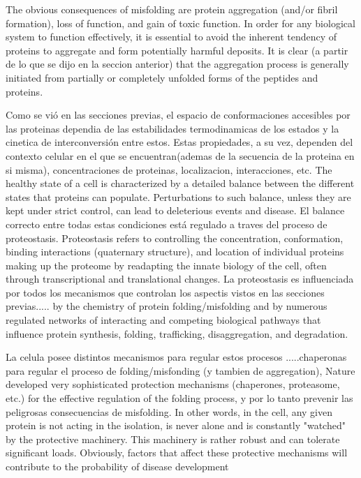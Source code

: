 The  obvious  consequences  of  misfolding  are protein  aggregation  (and/or  fibril  formation),  loss  of  function,  and  gain  of  toxic  function.  
In  order  for  any  biological  system  to  function  effectively,  it  is essential to avoid the inherent tendency of proteins to aggregate and form potentially harmful deposits.
It  is  clear (a partir de lo que se dijo en la seccion anterior)  that  the aggregation  process  is  generally   initiated  from  partially  or completely  unfolded  forms  of  the  peptides  and  proteins. 


Como se vió en las secciones previas, el espacio de conformaciones accesibles por las proteinas dependia de las estabilidades termodinamicas de los estados y la cinetica de interconversión entre estos. 
Estas propiedades, a su vez, dependen del contexto celular en el que se encuentran(ademas de la secuencia de la proteina en si misma), concentraciones de proteinas, localizacion, interacciones, etc.
The healthy state of a cell is characterized by a detailed balance between the different states that proteins can populate. 
Perturbations to such balance, unless they are kept under strict control, can lead to deleterious events and disease.
El balance correcto entre todas estas condiciones está regulado a traves del proceso de proteostasis.
Proteostasis refers to controlling the concentration, conformation, binding interactions (quaternary structure), and location of individual proteins making up the proteome by readapting the innate biology of the cell, 
often through transcriptional and translational changes.
La proteostasis es influenciada por todos los mecanismos que controlan los aspectis vistos en las secciones previas..... 
by the chemistry of protein folding/misfolding and by numerous regulated networks of interacting and competing biological pathways 
that influence protein synthesis, folding, trafficking, disaggregation, and degradation.

La celula posee distintos mecanismos para regular estos procesos .....chaperonas para regular el proceso de folding/misfonding (y tambien de aggregation), 
Nature developed very sophisticated protection mechanisms (chaperones, proteasome, etc.) for the effective regulation of the folding process, y por lo tanto prevenir las peligrosas consecuencias de misfolding. 
In other words, in the cell, any given protein is not acting in the isolation, is never alone and is constantly "watched" by the protective machinery. This machinery is rather robust and can
tolerate significant loads. Obviously, factors that affect these protective mechanisms will contribute to the probability of disease development

